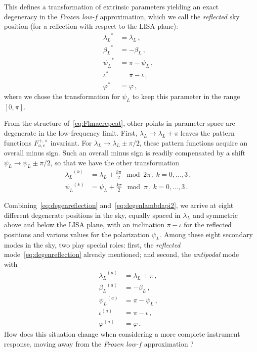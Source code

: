 \documentclass[aps,showpacs,twocolumn,prd,superscriptaddress,nofootinbib]{revtex4-1}
\newcommand{\nn}{\nonumber}
\newcommand\betaL{{\beta_{L}}}
\newcommand\lambdaL{{\lambda_{L}}}
\newcommand\psiL{{\psi_{L}}}
\begin{document}
This defines a transformation of extrinsic parameters yielding an exact degeneracy in the \textit{Frozen low-$f$} approximation, which we call the \textit{reflected} sky position (for a reflection with respect to the LISA plane):
\begin{align} \label{eq:degenreflection}
	\lambdaL^{*} &= \lambdaL \,, \nn \\
	\betaL^{*} &= -\betaL \,, \nn \\
	\psiL^{*} &= \pi - \psiL \,, \nn \\
	\iota^{*} &= \pi - \iota \,, \nn \\
	\varphi^{*} &= \varphi \,,
\end{align}
where we chose the transformation for $\psiL$ to keep this parameter in the range $[0, \pi]$.

From the structure of~\eqref{eq:Flmaerepeat}, other points in parameter space are degenerate in the low-frequency limit. First, $\lambdaL \rightarrow \lambdaL + \pi$ leaves the pattern functions $F_{a,e}^{+,\times}$ invariant. For $\lambdaL \rightarrow \lambdaL \pm \pi/2$, these pattern functions acquire an overall minus sign. Such an overall minus sign is readily compensated by a shift $\psiL \rightarrow \psiL \pm \pi/2$, so that we have the other transformation
\begin{align} \label{eq:degenlambdapi2}
	\lambdaL^{(k)} &= \lambdaL + \frac{k \pi}{2} \mod 2\pi \,, \, k = 0, \dots, 3 \,, \nn \\
	\psiL^{(k)} &= \psiL + \frac{k \pi}{2} \mod \pi \,, \, k = 0, \dots, 3 \,.
\end{align}

Combining~\eqref{eq:degenreflection} and~\eqref{eq:degenlambdapi2}, we arrive at eight different degenerate positions in the sky, equally spaced in $\lambdaL$ and symmetric above and below the LISA plane, with an inclination $\pi - \iota$ for the reflected positions and various values for the polarization $\psiL$. Among these eight secondary modes in the sky, two play special roles: first, the \textit{reflected} mode~\eqref{eq:degenreflection} already mentioned; and second, the \textit{antipodal} mode with
\begin{align} \label{eq:degenantipodal}
	\lambdaL^{(a)} &= \lambdaL + \pi \,, \nn \\
	\betaL^{(a)} &= -\betaL \,, \nn \\
	\psiL^{(a)} &= \pi - \psiL \,, \nn \\
	\iota^{(a)} &= \pi - \iota \,, \nn \\
	\varphi^{(a)} &= \varphi \,.
\end{align}
How does this situation change when considering a more complete instrument response, moving away from the \textit{Frozen low-$f$} approximation ?
\end{document}
